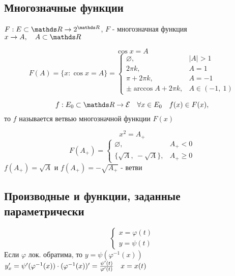 \documentclass[main]{subfiles}
\begin{document}
    \subsection{Многозначные функции}
    \begin{definition}
        $F: E \subset \R \ra 2^{\R}$, $F$ - многозначная функция\\
        $x\ra A,\q A \subset \R$
    \end{definition}

    \begin{Example}
        \[\cos x = A\]
        \[F(A) = \{x: \cos x = A\} = \begin{cases}
            \varnothing, & |A| > 1\\
            2\pi k, & A = 1\\
            \pi + 2\pi k, & A=-1\\
            \pm \arccos A + 2\pi k, & A \in (-1,\ 1)
        \end{cases}\]
    \end{Example}

    \begin{Definition}
        \[f: E_0 \subset \R \ra \E\q \forall x \in E_0 \q f(x) \in F(x),\]
        то $f$ называется ветвью многозначной функции $F(x)$
    \end{Definition}

    \begin{Example}
        \[x^2 = A_+\]
        \[F(A_+) = \begin{cases}
            \varnothing, & A_+ < 0\\
            \{\sqrt{A},\ -\sqrt{A}\}, & A_+ \geq 0
        \end{cases}\]
        $f(A_+) = \sqrt{A}$ и $f(A_+) = -\sqrt{A_+}$ - ветви
    \end{Example}

    \subsection{Производные и функции, заданные параметрически}
    \begin{Utv}
        \[\begin{cases}
            x = \varphi(t)\\
            y = \psi(t)
        \end{cases}\]
        Если $\varphi$ лок. обратима, то $y = \psi(\varphi^{-1}(x))$\\
        $y_x' = \psi'(\varphi^{-1}(x)) \cdot (\varphi^{-1}(x))' = \frac{\psi'(t)}{\varphi'(t)} \quad x = x(t)$
    \end{Utv}
\end{document}
